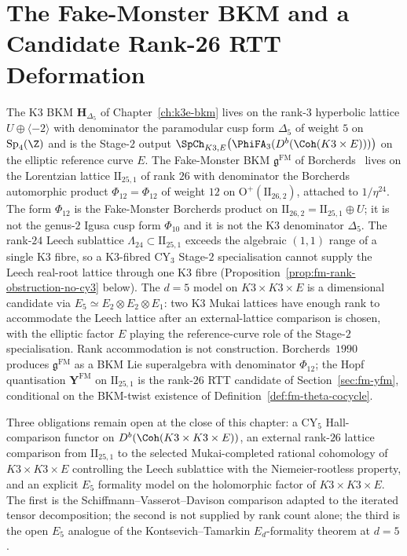 \chapter{The Fake-Monster BKM and a Candidate Rank-26 RTT Deformation}
\label{ch:fake-monster-bkm}

\providecommand{\gFM}{\mathfrak{g}^{\mathrm{FM}}}
\providecommand{\YFM}{\mathbf{Y}^{\mathrm{FM}}}
\providecommand{\RFM}{R^{\mathrm{FM}}}
\providecommand{\tFM}{\theta^{\mathrm{FM}}}
\providecommand{\PhiFM}{\Phi_{12}}
\providecommand{\Leech}{\Lambda_{24}}
\providecommand{\IIlor}{\mathrm{II}_{25,1}}
\providecommand{\IIpar}{\mathrm{II}_{26,2}}
\providecommand{\OpII}{\mathrm{O}^{+}(\IIpar)}
\providecommand{\Omlor}{\Omega_{\IIlor}}

The K3 BKM $\mathbf{H}_{\Delta_5}$ of
Chapter~\ref{ch:k3e-bkm} lives on the rank-$3$ hyperbolic lattice
$U \oplus \langle -2 \rangle$ with denominator the paramodular cusp
form $\Delta_5$ of weight $5$ on $\mathrm{Sp}_4(\Z)$ and is the
Stage-$2$ output $\SpCh_{K3, E}\!\left(\PhiFA_3(D^b(\Coh(K3 \times E)))\right)$
on the elliptic reference curve $E$. The Fake-Monster BKM
$\gFM$ of Borcherds~\cite{Borcherds1990Adv} lives on the
Lorentzian lattice $\IIlor$ of rank $26$ with denominator the
Borcherds automorphic product $\PhiFM = \Phi_{12}$ of weight $12$
on $\OpII$, attached to $1/\eta^{24}$.
The form $\Phi_{12}$ is the Fake-Monster Borcherds product on
$\IIpar = \IIlor \oplus U$; it is not the genus-$2$ Igusa cusp
form $\Phi_{10}$ and it is not the K3 denominator $\Delta_5$.
The rank-$24$ Leech sublattice $\Leech \subset \IIlor$ exceeds the
algebraic $(1, 1)$ range of a single K3 fibre, so a K3-fibred
CY$_3$ Stage-$2$ specialisation cannot supply the Leech real-root
lattice through one K3 fibre
(Proposition~\ref{prop:fm-rank-obstruction-no-cy3} below).
The $d = 5$ model on $K3 \times K3 \times E$ is a dimensional
candidate via $E_5 \simeq E_2 \otimes E_2 \otimes E_1$: two K3
Mukai lattices have enough rank to accommodate the Leech lattice
after an external-lattice comparison is chosen, with the elliptic factor $E$
playing the reference-curve role of the Stage-$2$ specialisation.
Rank accommodation is not construction. Borcherds~$1990$ produces
$\gFM$ as a BKM Lie superalgebra with denominator $\Phi_{12}$; the
Hopf quantisation $\YFM$ on $\IIlor$ is the rank-$26$ RTT candidate
of Section~\ref{sec:fm-yfm}, conditional on the BKM-twist existence
of Definition~\ref{def:fm-theta-cocycle}.

Three obligations remain open at the close of this chapter: a
CY$_5$ Hall-comparison functor on
$D^b(\Coh(K3 \times K3 \times E))$, an external rank-$26$ lattice
comparison from $\IIlor$ to the selected Mukai-completed rational
cohomology of $K3 \times K3 \times E$ controlling the Leech sublattice
with the Niemeier-rootless property, and an explicit $E_5$ formality
model on the holomorphic factor of $K3 \times K3 \times E$. The first
is the Schiffmann--Vasserot--Davison comparison adapted to the iterated
tensor decomposition; the second is not supplied by rank count alone;
the third is the open $E_5$ analogue of the Kontsevich--Tamarkin
$E_d$-formality theorem at $d = 5$.

